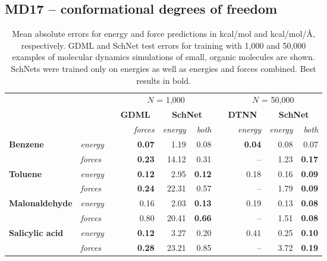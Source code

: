 \documentclass{article}
\begin{document}
\subsection{MD17 -- conformational degrees of freedom}
\setlength{\tabcolsep}{5pt}
\begin{table}
\caption{Mean absolute errors for energy and force predictions in kcal/mol and kcal/mol/\AA, respectively. GDML and SchNet test errors for training with 1,000 and 50,000 examples of molecular dynamics simulations of small, organic molecules are shown. SchNets were trained only on energies as well as energies and forces combined. Best results in bold.}\label{tab:md}
\centering
\small
\begin{tabular}{llrrrrrrrr}
\toprule
 & & & \multicolumn{3}{c}{$N$ = 1,000} & & \multicolumn{3}{c}{$N$ = 50,000}\\ \cmidrule{4-6} \cmidrule{8-10}
& & & \textbf{GDML}~\citep{chmiela2017machine} & \multicolumn{2}{c}{\textbf{SchNet}} & & \textbf{DTNN}~\citep{schutt2017quantum} & \multicolumn{2}{c}{\textbf{SchNet}} \\
& & & \textit{forces} &  \textit{energy} & \textit{both} & & \textit{energy} & \textit{energy} & \textit{both} \\ \cmidrule{1-2} \cmidrule{4-6} \cmidrule{8-10}
\multirow{2}{*}{\textbf{Benzene}} 		 & \textit{energy} & & \textbf{0.07} & 1.19 & 0.08  && \textbf{0.04} & 0.08 & 0.07 \\
						 		 & \textit{forces} & & \textbf{0.23} & 14.12 & 0.31 && -- & 1.23 & \textbf{0.17} \\\cmidrule{1-2} \cmidrule{4-6} \cmidrule{8-10}
\multirow{2}{*}{\textbf{Toluene}} 		 & \textit{energy} & & \textbf{0.12} & 2.95 & \textbf{0.12}  && 0.18 & 0.16 & \textbf{0.09} \\
						 		 & \textit{forces} & & \textbf{0.24} & 22.31 & 0.57 && -- & 1.79 & \textbf{0.09} \\ \cmidrule{1-2} \cmidrule{4-6} \cmidrule{8-10}
\multirow{2}{*}{\textbf{Malonaldehyde}}  & \textit{energy} & & 0.16 & 2.03 & \textbf{0.13}  && 0.19 & 0.13 & \textbf{0.08} \\
								 & \textit{forces} & & 0.80 & 20.41 & \textbf{0.66} && -- & 1.51 & \textbf{0.08} \\\cmidrule{1-2} \cmidrule{4-6} \cmidrule{8-10}
\multirow{2}{*}{\textbf{Salicylic acid}} & \textit{energy} & & \textbf{0.12} & 3.27 & 0.20  && 0.41 & 0.25 & \textbf{0.10} \\
								 & \textit{forces} & & \textbf{0.28} & 23.21 & 0.85 && -- & 3.72 & \textbf{0.19} \\ \cmidrule{1-2} \cmidrule{4-6} \cmidrule{8-10}

\end{tabular}
\end{table}
\end{document}
